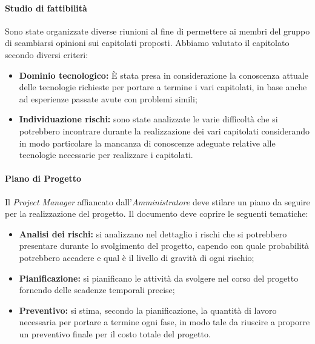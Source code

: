 		\paragraph{Studio di fattibilità} \Spazio
		Sono state organizzate diverse riunioni al fine di permettere ai membri del gruppo di scambiarsi opinioni sui capitolati proposti. 
		Abbiamo valutato il capitolato secondo diversi criteri:
		\begin{itemize}
			\item \textbf{Dominio tecnologico:} È stata presa in considerazione la conoscenza attuale delle tecnologie richieste per portare a termine i vari capitolati, in base anche ad esperienze passate avute con problemi simili;
			\item \textbf{Individuazione rischi:} sono state analizzate le varie difficoltà che si potrebbero incontrare durante la realizzazione dei vari capitolati considerando in modo particolare la mancanza di conoscenze adeguate relative alle tecnologie necessarie per realizzare i capitolati.
		\end{itemize}  
		\paragraph{Piano di Progetto} \Spazio
		Il \emph{Project Manager} affiancato dall'\emph{Amministratore} deve stilare un piano da seguire per la realizzazione del progetto.
		Il documento deve coprire le seguenti tematiche:
		\begin{itemize}
		\item \textbf{Analisi dei rischi:} si analizzano nel dettaglio i rischi che si potrebbero presentare durante lo svolgimento del progetto, capendo con quale probabilità potrebbero accadere e qual è il livello di gravità di ogni rischio;
		\item \textbf{Pianificazione:} si pianificano le attività da svolgere nel corso del progetto fornendo delle scadenze temporali precise;
		\item \textbf{Preventivo:} si stima, secondo la pianificazione, la quantità di lavoro necessaria per portare a termine ogni fase, in modo tale da riuscire a proporre un preventivo finale per il costo totale del progetto.
		\end{itemize} 
		

